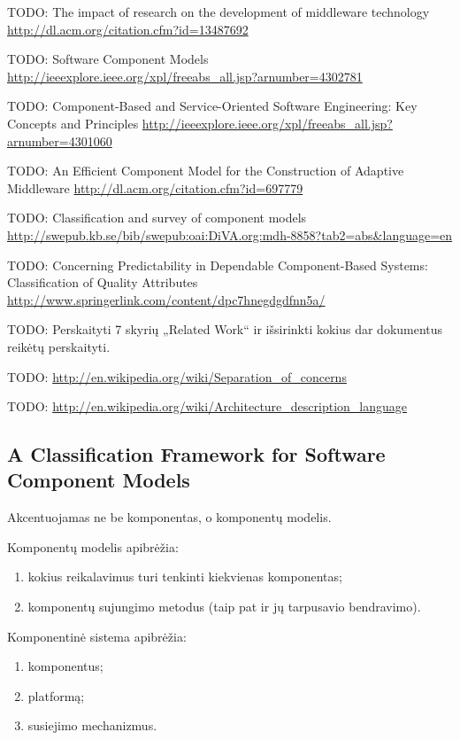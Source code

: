 TODO: The impact of research on the development of middleware technology
\url{http://dl.acm.org/citation.cfm?id=13487692}

TODO: Software Component Models
\url{http://ieeexplore.ieee.org/xpl/freeabs_all.jsp?arnumber=4302781}

TODO: Component-Based and Service-Oriented Software Engineering: Key Concepts and Principles 
\url{http://ieeexplore.ieee.org/xpl/freeabs_all.jsp?arnumber=4301060}

TODO: An Efficient Component Model for the Construction of Adaptive Middleware
\url{http://dl.acm.org/citation.cfm?id=697779}

TODO: Classification and survey of component models
\url{http://swepub.kb.se/bib/swepub:oai:DiVA.org:mdh-8858?tab2=abs&language=en}

TODO: Concerning Predictability in Dependable Component-Based Systems: Classification of Quality Attributes 
\url{http://www.springerlink.com/content/dpc7hnegdgdfnn5a/}

TODO: Perskaityti \cite[18]{classification-framework-for-scm} 7 skyrių
„Related Work“ ir išsirinkti kokius dar dokumentus reikėtų perskaityti.

TODO: \url{http://en.wikipedia.org/wiki/Separation_of_concerns}

TODO: \url{http://en.wikipedia.org/wiki/Architecture_description_language}

\subsection{A Classification Framework for Software Component Models}

Akcentuojamas ne be komponentas, o komponentų modelis.

\begin{defn}
  Komponentų modelis apibrėžia:
  \begin{enumerate}
    \item kokius reikalavimus turi tenkinti kiekvienas komponentas;
    \item komponentų sujungimo metodus (taip pat ir jų tarpusavio
      bendravimo).
  \end{enumerate}
  \cite[2]{classification-framework-for-scm}
\end{defn}

\begin{defn}
  Komponentinė sistema apibrėžia:
  \begin{enumerate}
    \item komponentus;
    \item platformą;
    \item susiejimo mechanizmus.
  \end{enumerate}
  \cite[2]{classification-framework-for-scm}
\end{defn}
